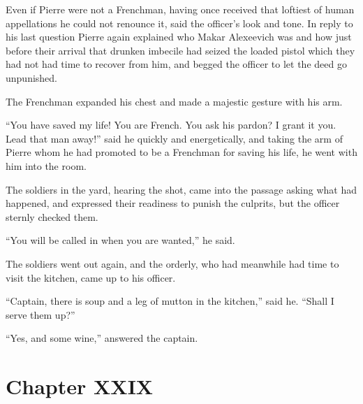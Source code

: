 Even if Pierre were not a Frenchman, having once received that
loftiest of human appellations he could not renounce it, said the
officer's look and tone. In reply to his last question Pierre
again explained who Makar Alexeevich was and how just before
their arrival that drunken imbecile had seized the loaded pistol
which they had not had time to recover from him, and begged the
officer to let the deed go unpunished.

The Frenchman expanded his chest and made a majestic gesture with
his arm.

``You have saved my life! You are French. You ask his pardon? I
grant it you. Lead that man away!'' said he quickly and
energetically, and taking the arm of Pierre whom he had promoted
to be a Frenchman for saving his life, he went with him into the
room.

The soldiers in the yard, hearing the shot, came into the passage
asking what had happened, and expressed their readiness to punish
the culprits, but the officer sternly checked them.

``You will be called in when you are wanted,'' he said.

The soldiers went out again, and the orderly, who had meanwhile
had time to visit the kitchen, came up to his officer.

``Captain, there is soup and a leg of mutton in the kitchen,''
said he.  ``Shall I serve them up?''

``Yes, and some wine,'' answered the captain.


\chapter*{Chapter XXIX} \ifaudio {}
\fi

